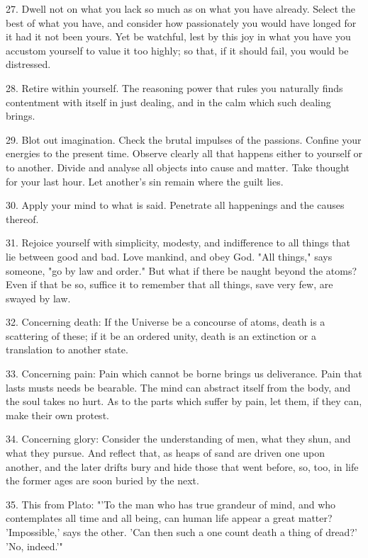 \documentclass{book}
\begin{document}
27. Dwell not on what you lack so much as on what you have
already. Select the best of what you have, and consider how
passionately you would have longed for it had it not been yours. Yet
be watchful, lest by this joy in what you have you accustom yourself
to value it too highly; so that, if it should fail, you would be
distressed.

28. Retire within yourself. The reasoning power that rules you
naturally finds contentment with itself in just dealing, and in the
calm which such dealing brings.

29. Blot out imagination. Check the brutal impulses of the
passions. Confine your energies to the present time. Observe clearly
all that happens either to yourself or to another. Divide and analyse
all objects into cause and matter. Take thought for your last
hour. Let another's sin remain where the guilt lies.

\newpage

30. Apply your mind to what is said. Penetrate all happenings and the
causes thereof.

31. Rejoice yourself with simplicity, modesty, and indifference to all
things that lie between good and bad. Love mankind, and obey God. "All
things," says someone, "go by law and order." But what if there be
naught beyond the atoms? Even if that be so, suffice it to remember
that all things, save very few, are swayed by law.

32. Concerning death: If the Universe be a concourse of atoms, death
is a scattering of these; if it be an ordered unity, death is an
extinction or a translation to another state.

33. Concerning pain: Pain which cannot be borne brings us
deliverance. Pain that lasts musts needs be bearable. The mind can
abstract itself from the body, and the soul takes no hurt. As to the
parts which suffer by pain, let them, if they can, make their own
protest.

34. Concerning glory: Consider the understanding of men, what they
shun, and what they pursue. And reflect that, as heaps of sand are
driven one upon another, and the later drifts bury and hide those that
went before, so, too, in life the former ages are soon buried by the
next.

35. This from Plato: "'To the man who has true grandeur of mind, and
who contemplates all time and all being, can human life appear a great
matter? 'Impossible,' says the other. 'Can then such a one count death
a thing of dread?' 'No, indeed.'"
\end{document}

